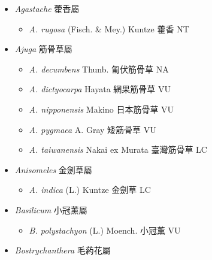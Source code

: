 
  \begin{itemize}
 \item[] \textit{Agastache} 藿香屬
                                
  \begin{itemize}
        \item[] \textit{A. rugosa} (Fisch. \& Mey.) Kuntze  藿香   NT
  \end{itemize}
 \item[] \textit{Ajuga} 筋骨草屬
                                
  \begin{itemize}
        \item[] \textit{A. decumbens} Thunb.  匍伏筋骨草   NA
        \item[] \textit{A. dictyocarpa} Hayata  網果筋骨草   VU
        \item[] \textit{A. nipponensis} Makino  日本筋骨草   VU
        \item[] \textit{A. pygmaea} A. Gray  矮筋骨草   VU
        \item[] \textit{A. taiwanensis} Nakai ex Murata  臺灣筋骨草   LC
  \end{itemize}
 \item[] \textit{Anisomeles} 金劍草屬
                                
  \begin{itemize}
        \item[] \textit{A. indica} (L.) Kuntze  金劍草   LC
  \end{itemize}
 \item[] \textit{Basilicum} 小冠薰屬
                                
  \begin{itemize}
        \item[] \textit{B. polystachyon} (L.) Moench.  小冠薰   VU
  \end{itemize}
 \item[] \textit{Bostrychanthera} 毛葯花屬
                                

\end{itemize}
